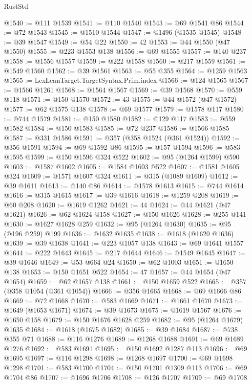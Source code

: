 \begin{lexlean}{RustStd}
\begin{coremodule}
@1540 := @111 @1539
@1541 := @110 @1540
@1543 := @69 @1541 @86
@1544 := @72 @1543
@1545 := @1510 @1544
@1547 := @1496 (@1535 @1545)
@1548 := @39 @1547
@1549 := @54 @22
@1550 := 42
@1553 := @44 @1550 (@47 @1550)
@1555 := @223 @1553 @138
@1556 := @69 @1555
@1557 := @140 @237
@1558 := @1556 @1557
@1559 := @222 @1558
@1560 := @217 @1559
@1561 := @1549 @1560
@1562 := @39 @1561
@1563 := @55 @355
@1564 := @1259 @1563
@1565 := LexLeanTarget.TargetSyntax.Prim.index
@1566 := @124 @1565
@1567 := @1566 @1261
@1568 := @1564 @1567
@1569 := @39 @1568
@1570 := @559 @118
@1571 := @150 @1570
@1572 := 43
@1575 := @44 @1572 (@47 @1572)
@1577 := @62 @1575 @138
@1578 := @69 @1577
@1579 := @1578 @117
@1580 := @744 @1579
@1581 := @150 @1580
@1582 := @129 @117
@1583 := @559 @1582
@1584 := @150 @1583
@1585 := @72 @237
@1586 := @1566 @1585
@1587 := @331 @1586
@1591 := @357 (@358 @1524 (@361 @1524))
@1592 := @356 @1591
@1594 := @69 @1592 @86
@1595 := @157 @1594
@1596 := @583 @1595
@1599 := @150 @1596 @324 @522
@1602 := @95 (@1264 @1599) @590
@1603 := @1587 @1602
@1605 := @1584 @1603 @522
@1607 := @1581 @1605 @324
@1609 := @1571 @1607 @324
@1611 := @315 (@1089 @1609)
@1612 := @39 @1611
@1613 := @140 @86
@1614 := @1578 @1613
@1615 := @744 @1614
@1616 := @315 @1615
@1617 := @39 @1616
@1618 := @1259 @208
@1619 := @60 @208
@1620 := @1619 @1262
@1621 := 44
@1624 := @44 @1621 (@47 @1621)
@1626 := @62 @1624 @158
@1627 := @150 @1626
@1628 := @255 @141
@1630 := @1627 @1628 @259
@1632 := @95 (@1264 @1630)
@1635 := @95 (@196 @259) @199
@1636 := @1632 @1635
@1638 := @1618 (@1620 @1636)
@1639 := @39 @1638
@1641 := @223 @1057 @138
@1643 := @69 @1641 @1557
@1644 := @222 @1643
@1645 := @217 @1644
@1646 := @1549 @1645
@1647 := @39 @1646
@1649 := @53 @664 @24
@1650 := @62 @1003
@1651 := @1650 @138
@1653 := @150 @1651 @522
@1654 := 47
@1657 := @44 @1654 (@47 @1654)
@1659 := @62 @1657 @138
@1661 := @150 @1659 @522
@1665 := @357 (@358 @1054 (@361 @1054))
@1666 := @356 @1665
@1668 := @69 @1666 @86
@1669 := @72 @1668
@1670 := @583 @1669
@1671 := @1661 @1670
@1673 := @1649 (@1653 @1671)
@1674 := @39 @1673
@1675 := @1619 @1567
@1676 := @1650 @158
@1679 := @150 @1676 @1628 @259
@1682 := @95 (@1264 @1679) @1635
@1684 := @1618 (@1675 @1682)
@1685 := @39 @1684
@1687 := @738 @355 @71
@1688 := @116 @1276
@1689 := @1268 @1688
@1691 := @69 @1689 @1276
@1692 := @583 @1691
@1695 := @150 @1692 @1287 @113
@1696 := @69 @1695
@1697 := @116 @1298
@1698 := @1268 @1697
@1700 := @69 @1698 @1298
@1701 := @583 @1700
@1704 := @150 @1701 @1309 @113
@1706 := @69 @1704 @86
@1707 := @1696 @1706
@1708 := @126 @1707
@1709 := @69 @1708

\end{coremodule}
\end{lexlean}
